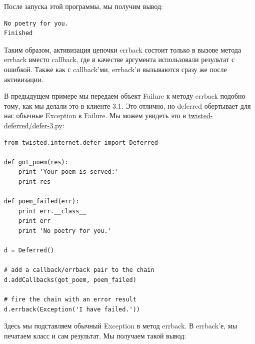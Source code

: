 После запуска этой программы, мы получим вывод:

\begin{scriptsize}\begin{verbatim}
No poetry for you.
Finished
\end{verbatim}\end{scriptsize}


Таким образом, активизация цепочки errback состоит только в 
вызове метода errback вместо callback, где в качестве 
аргумента использовали результат с ошибкой. Также как с 
callback'ми, errback'и вызываются сразу же после активизации.  



В предыдущем примере мы передаем объект Failure к методу 
errback подобно тому, как мы делали это в клиенте 3.1. Это отлично, 
но deferred обертывает для нас обычные Exception в Failure. Мы 
можем увидеть это в 
\href{http://github.com/jdavisp3/twisted-intro/blob/master/twisted-deferred/defer-3.py}{twisted-deferred/defer-3.py}:

\begin{scriptsize}\begin{verbatim}
from twisted.internet.defer import Deferred

def got_poem(res):
    print 'Your poem is served:'
    print res

def poem_failed(err):
    print err.__class__
    print err
    print 'No poetry for you.'

d = Deferred()

# add a callback/errback pair to the chain
d.addCallbacks(got_poem, poem_failed)

# fire the chain with an error result
d.errback(Exception('I have failed.'))
\end{verbatim}\end{scriptsize}


Здесь мы подставляем обычный Exception в метод errback. 
В errback'е, мы печатаем класс и сам результат. Мы получаем такой вывод:

